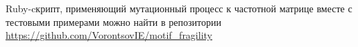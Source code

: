 \documentclass[a4paper]{article}
\begin{document}






Ruby-cкрипт, применяющий мутационный процесс к частотной матрице вместе с тестовыми примерами можно найти в репозитории \url{https://github.com/VorontsovIE/motif_fragility}
\end{document}
